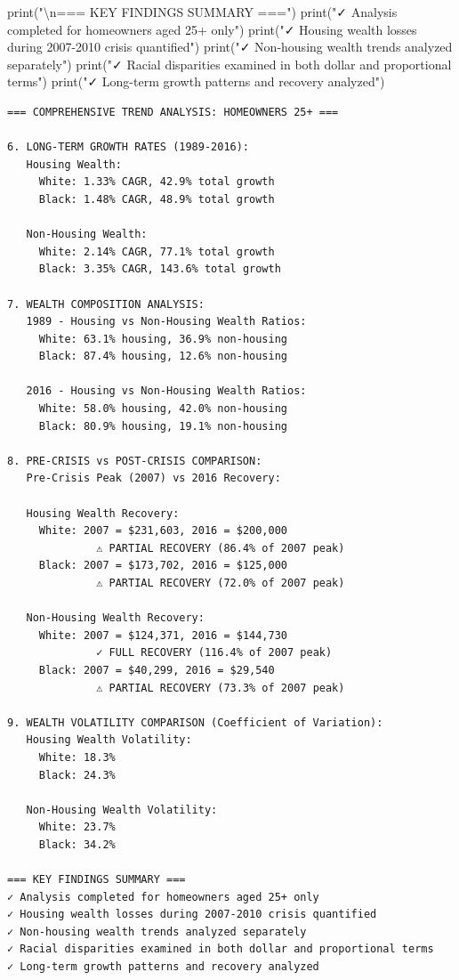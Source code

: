 \documentclass[
  letterpaper,
  DIV=11,
  numbers=noendperiod]{scrartcl}
\newenvironment{Shaded}{\begin{snugshade}}{\end{snugshade}}
\newcommand{\BuiltInTok}[1]{\textcolor[rgb]{0.00,0.23,0.31}{#1}}
\newcommand{\CharTok}[1]{\textcolor[rgb]{0.13,0.47,0.30}{#1}}
\newcommand{\NormalTok}[1]{\textcolor[rgb]{0.00,0.23,0.31}{#1}}
\newcommand{\StringTok}[1]{\textcolor[rgb]{0.13,0.47,0.30}{#1}}
\begin{document}
\begin{Shaded}
\begin{Highlighting}[]
\BuiltInTok{print}\NormalTok{(}\StringTok{"}\CharTok{\textbackslash{}n}\StringTok{=== KEY FINDINGS SUMMARY ==="}\NormalTok{)}
\BuiltInTok{print}\NormalTok{(}\StringTok{"✓ Analysis completed for homeowners aged 25+ only"}\NormalTok{)}
\BuiltInTok{print}\NormalTok{(}\StringTok{"✓ Housing wealth losses during 2007{-}2010 crisis quantified"}\NormalTok{)}
\BuiltInTok{print}\NormalTok{(}\StringTok{"✓ Non{-}housing wealth trends analyzed separately"}\NormalTok{)}
\BuiltInTok{print}\NormalTok{(}\StringTok{"✓ Racial disparities examined in both dollar and proportional terms"}\NormalTok{)}
\BuiltInTok{print}\NormalTok{(}\StringTok{"✓ Long{-}term growth patterns and recovery analyzed"}\NormalTok{)}
\end{Highlighting}
\end{Shaded}

\begin{verbatim}
=== COMPREHENSIVE TREND ANALYSIS: HOMEOWNERS 25+ ===

6. LONG-TERM GROWTH RATES (1989-2016):
   Housing Wealth:
     White: 1.33% CAGR, 42.9% total growth
     Black: 1.48% CAGR, 48.9% total growth

   Non-Housing Wealth:
     White: 2.14% CAGR, 77.1% total growth
     Black: 3.35% CAGR, 143.6% total growth

7. WEALTH COMPOSITION ANALYSIS:
   1989 - Housing vs Non-Housing Wealth Ratios:
     White: 63.1% housing, 36.9% non-housing
     Black: 87.4% housing, 12.6% non-housing

   2016 - Housing vs Non-Housing Wealth Ratios:
     White: 58.0% housing, 42.0% non-housing
     Black: 80.9% housing, 19.1% non-housing

8. PRE-CRISIS vs POST-CRISIS COMPARISON:
   Pre-Crisis Peak (2007) vs 2016 Recovery:

   Housing Wealth Recovery:
     White: 2007 = $231,603, 2016 = $200,000
              ⚠ PARTIAL RECOVERY (86.4% of 2007 peak)
     Black: 2007 = $173,702, 2016 = $125,000
              ⚠ PARTIAL RECOVERY (72.0% of 2007 peak)

   Non-Housing Wealth Recovery:
     White: 2007 = $124,371, 2016 = $144,730
              ✓ FULL RECOVERY (116.4% of 2007 peak)
     Black: 2007 = $40,299, 2016 = $29,540
              ⚠ PARTIAL RECOVERY (73.3% of 2007 peak)

9. WEALTH VOLATILITY COMPARISON (Coefficient of Variation):
   Housing Wealth Volatility:
     White: 18.3%
     Black: 24.3%

   Non-Housing Wealth Volatility:
     White: 23.7%
     Black: 34.2%

=== KEY FINDINGS SUMMARY ===
✓ Analysis completed for homeowners aged 25+ only
✓ Housing wealth losses during 2007-2010 crisis quantified
✓ Non-housing wealth trends analyzed separately
✓ Racial disparities examined in both dollar and proportional terms
✓ Long-term growth patterns and recovery analyzed
\end{verbatim}
\end{document}
